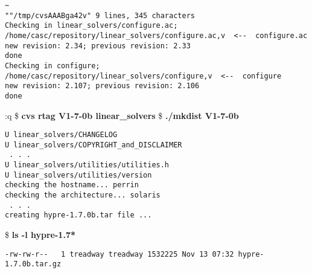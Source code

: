 \begin{ttfamily}
\begin{mdseries}
\begin{verbatim}
~
""/tmp/cvsAAABga42v" 9 lines, 345 characters
Checking in linear_solvers/configure.ac;
/home/casc/repository/linear_solvers/configure.ac,v  <--  configure.ac
new revision: 2.34; previous revision: 2.33
done
Checking in configure;
/home/casc/repository/linear_solvers/configure,v  <--  configure
new revision: 2.107; previous revision: 2.106
done
\end{verbatim}
:q
\$ \textbf{cvs rtag V1-7-0b linear\_solvers}\linebreak
\$ \textbf{./mkdist V1-7-0b}\linebreak
\begin{verbatim}
U linear_solvers/CHANGELOG
U linear_solvers/COPYRIGHT_and_DISCLAIMER
 . . .
U linear_solvers/utilities/utilities.h
U linear_solvers/utilities/version
checking the hostname... perrin
checking the architecture... solaris
 . . .
creating hypre-1.7.0b.tar file ...
\end{verbatim}
\$ \textbf{ls -l hypre-1.7*}\linebreak
\begin{verbatim}
-rw-rw-r--   1 treadway treadway 1532225 Nov 13 07:32 hypre-1.7.0b.tar.gz


\end{verbatim}
\end{mdseries}
\end{ttfamily}
